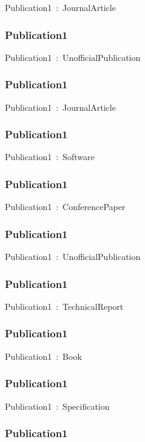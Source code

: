 \documentclass{article}
\begin{document}
Publication1~:~JournalArticle

\subsubsection*{Publication1}

Publication1~:~UnofficialPublication

\subsubsection*{Publication1}

Publication1~:~JournalArticle

\subsubsection*{Publication1}

Publication1~:~Software

\subsubsection*{Publication1}

Publication1~:~ConferencePaper

\subsubsection*{Publication1}

Publication1~:~UnofficialPublication

\subsubsection*{Publication1}

Publication1~:~TechnicalReport

\subsubsection*{Publication1}

Publication1~:~Book

\subsubsection*{Publication1}

Publication1~:~Specification

\subsubsection*{Publication1}
\end{document}

